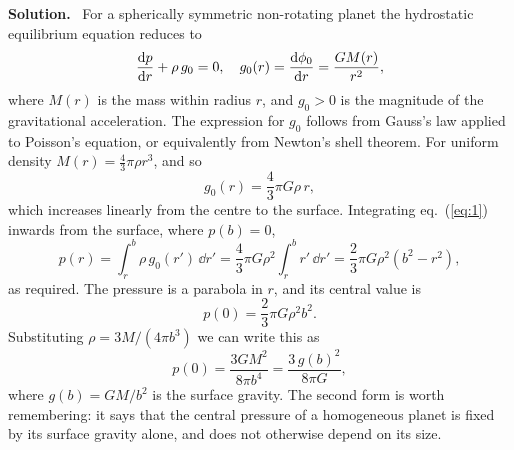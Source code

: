 \documentclass[a4paper,12pt]{paper}
\newenvironment{solution}{\par\noindent\textbf{Solution.}\ }{\par\medskip}
\begin{document}
\begin{solution}
For a spherically symmetric non-rotating planet the hydrostatic equilibrium equation reduces to
\begin{equation}
\frac{\mathrm{d} p}{\mathrm{d} r}+\rho\,g_{0}=0,\quad g_{0}(r)=\frac{\mathrm{d}\phi_{0}}{\mathrm{d} r}=\frac{GM(r)}{r^{2}},
\label{eq:1}
\end{equation}
where $M(r)$ is the mass within radius $r$, and $g_{0}>0$ is the magnitude of the gravitational
acceleration. The expression for $g_{0}$ follows from Gauss's law applied to Poisson's equation, or
equivalently from Newton's shell theorem. For uniform density $M(r)=\frac{4}{3}\pi\rho r^{3}$, and so
\begin{equation}
g_{0}(r)=\frac{4}{3}\pi G\rho\,r,
\label{eq:2}
\end{equation}
which increases linearly from the centre to the surface. Integrating eq.~(\ref{eq:1}) inwards from
the surface, where $p(b)=0$,
\begin{equation}
p(r)=\int_{r}^{b}\rho\,g_{0}(r')\,\dd r'=\frac{4}{3}\pi G\rho^{2}\int_{r}^{b}r'\,\dd r'=\frac{2}{3}\pi G\rho^{2}(b^{2}-r^{2}),
\label{eq:3}
\end{equation}
as required. The pressure is a parabola in $r$, and its central value is
\begin{equation}
p(0)=\frac{2}{3}\pi G\rho^{2}b^{2}.
\label{eq:4}
\end{equation}
Substituting $\rho=3M/(4\pi b^{3})$ we can write this as
\begin{equation}
p(0)=\frac{3GM^{2}}{8\pi b^{4}}=\frac{3\,g(b)^{2}}{8\pi G},
\label{eq:5}
\end{equation}
where $g(b)=GM/b^{2}$ is the surface gravity. The second form is worth remembering: it says that
the central pressure of a homogeneous planet is fixed by its surface gravity alone, and does not
otherwise depend on its size.


\end{solution}
\end{document}
